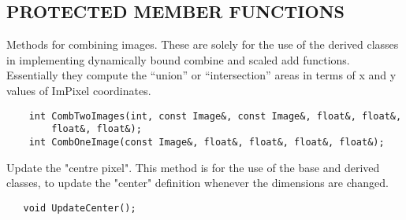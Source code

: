 \subsection*{PROTECTED MEMBER FUNCTIONS}
      Methods for combining images. These are solely for the use of the
      derived classes in implementing dynamically bound combine and
      scaled add functions. Essentially they compute the ``union'' or
      ``intersection'' areas in terms of x and y values of ImPixel coordinates.
\begin{verbatim}
    int CombTwoImages(int, const Image&, const Image&, float&, float&,
		float&, float&);
    int CombOneImage(const Image&, float&, float&, float&, float&);

\end{verbatim}

      Update the "centre pixel". This method is for the use of the base
      and derived classes, to update the "center" definition whenever the
      dimensions are changed.
\begin{verbatim}
   void UpdateCenter();
\end{verbatim}
